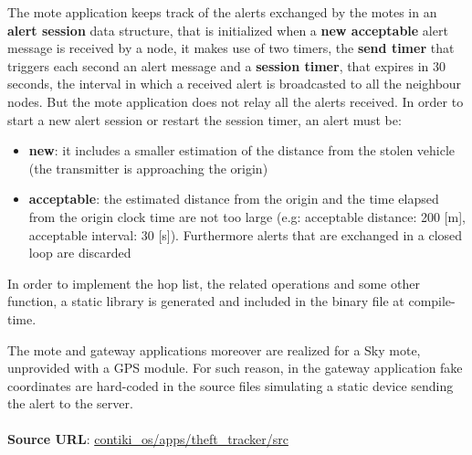 \documentclass[]{article}
\begin{document}
The mote application keeps track of the alerts exchanged by the motes in an \textbf{alert session} data structure, that is initialized when a \textbf{new acceptable} alert message is received by a node, it makes use of two timers, the \textbf{send timer} that triggers each second an alert message and a \textbf{session timer}, that expires in 30 seconds, the interval in which a received alert is broadcasted to all the neighbour nodes. But the mote application does not relay all the alerts received. In order to start a new alert session or restart the session timer, an alert must be:
\begin{itemize}
	\item \textbf{new}: it includes a smaller estimation of the distance from the stolen vehicle (the transmitter is approaching the origin) 
	\item \textbf{acceptable}: the estimated distance from the origin and the time elapsed from the origin clock time are not too large (e.g: acceptable distance: 200 [m], acceptable interval: 30 [s]). Furthermore alerts that are exchanged in a closed loop are discarded
\end{itemize}
In order to implement the hop list, the related operations and some other function, a static library is generated and included in the binary file at compile-time. \par 
The mote and gateway applications moreover are realized for a Sky mote, unprovided with a GPS module. For such reason, in the gateway application fake coordinates are hard-coded in the source files simulating a static device sending the alert to the server. 

\paragraph{}
\textbf{Source URL}: \href{https://github.com/GiorgioCozza/theft_tracker/tree/master/contiki_os/apps/theft_tracker/src}{contiki\_os/apps/theft\_tracker/src}
\paragraph{}
\end{document}
